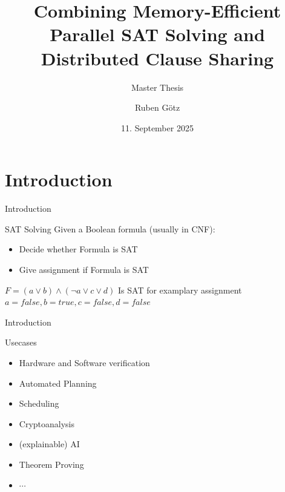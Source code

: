 \documentclass[]{sdqbeamer}
\title{Combining Memory-Efficient Parallel SAT Solving and Distributed Clause Sharing}
\subtitle{Master Thesis}
\author{Ruben Götz}
\date[11.\,9.\,2025]{11. September 2025}
\begin{document}
\begin{frame}[title white vertical, picture=images/palladio_bauplan]
	\titlepage
\end{frame}


\section{Introduction}
\begin{frame}{Introduction}
    \begin{block}{SAT Solving}
        Given a Boolean formula (usually in CNF):
        \begin{itemize}
            \item Decide whether Formula is SAT
            \item Give assignment if Formula is SAT
        \end{itemize}
    \end{block}

    \begin{exampleblock}{$F = (a \lor b) \land (\lnot a \lor c \lor d)$}
        Is SAT for examplary assignment $a = false, b = true, c = false, d = false$
    \end{exampleblock}
\end{frame}

\begin{frame}{Introduction}
    \begin{block}{Usecases}
        \begin{itemize}
            \item Hardware and Software verification
            \item Automated Planning
            \item Scheduling
            \item Cryptoanalysis
            \item (explainable) AI
            \item Theorem Proving
            \item $\cdots$
        \end{itemize}
    \end{block}
\end{frame}

\end{document}
